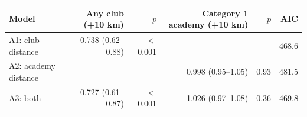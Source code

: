 \begin{tabular}{lrrrrr}
\toprule
Model & Any club (+10 km) & $p$ & Category 1 academy (+10 km) & $p$ & AIC
\\
\midrule
A1: club distance & 0.738 (0.62--0.88) & $<$0.001 &  &  & 468.6 \\
A2: academy distance &  &  & 0.998 (0.95--1.05) & 0.93 & 481.5 \\
A3: both & 0.727 (0.61--0.87) & $<$0.001 & 1.026 (0.97--1.08) & 0.36 & 469.8 \\
\bottomrule
\end{tabular}
